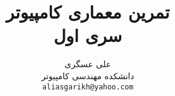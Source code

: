 \documentclass[12pt]{article}
\title{ تمرین معماری کامپیوتر\\سری اول}
\author{علی عسگری
\LTRfootnote{aliasgarikh@yahoo.com}
 \\
دانشکده مهندسی کامپیوتر \\
  {\tt aliasgarikh@yahoo.com} }
\date{}
\begin{document}
\maketitle

\section{}

\end{document}
